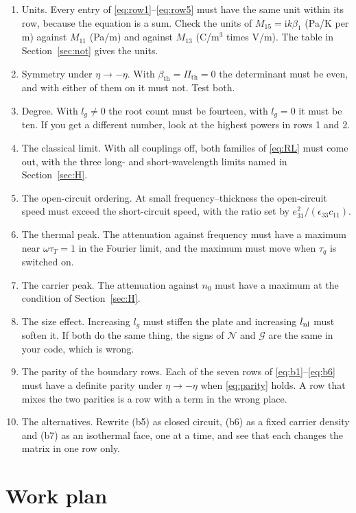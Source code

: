 \documentclass[11pt,a4paper]{article}
\newcommand{\Nc}{\mathcal{N}}
\newcommand{\Gc}{\mathcal{G}}
\newcommand{\bth}{\beta_{\mathrm{th}}}
\newcommand{\Pth}{\Pi_{\mathrm{th}}}
\newcommand{\ii}{\mathrm{i}}
\begin{document}
\begin{enumerate}
\item Units. Every entry of \eqref{eq:row1}--\eqref{eq:row5} must have the same unit within its row, because
the equation is a sum. Check the units of $M_{15}=\ii k\beta_1$ (Pa/K per m) against $M_{11}$ (Pa/m) and
against $M_{13}$ (C/m$^3$ times V/m). The table in Section~\ref{sec:not} gives the units.
\item Symmetry under $\eta\to-\eta$. With $\bth=\Pth=0$ the determinant must be even, and with either of them
on it must not. Test both.
\item Degree. With $l_g\ne0$ the root count must be fourteen, with $l_g=0$ it must be ten. If you get a
different number, look at the highest powers in rows 1 and 2.
\item The classical limit. With all couplings off, both families of \eqref{eq:RL} must come out, with the
three long- and short-wavelength limits named in Section~\ref{sec:H}.
\item The open-circuit ordering. At small frequency--thickness the open-circuit speed must exceed the
short-circuit speed, with the ratio set by $e_{31}^2/(\epsilon_{33}c_{11})$.
\item The thermal peak. The attenuation against frequency must have a maximum near $\omega\tau_T=1$ in the
Fourier limit, and the maximum must move when $\tau_q$ is switched on.
\item The carrier peak. The attenuation against $n_0$ must have a maximum at the condition of
Section~\ref{sec:H}.
\item The size effect. Increasing $l_g$ must stiffen the plate and increasing $l_{\rm nl}$ must soften it.
If both do the same thing, the signs of $\Nc$ and $\Gc$ are the same in your code, which is wrong.
\item The parity of the boundary rows. Each of the seven rows of \eqref{eq:b1}--\eqref{eq:b6} must have a
definite parity under $\eta\to-\eta$ when \eqref{eq:parity} holds. A row that mixes the two parities is a
row with a term in the wrong place.
\item The alternatives. Rewrite (b5) as closed circuit, (b6) as a fixed carrier density and (b7) as an
isothermal face, one at a time, and see that each changes the matrix in one row only.
\end{enumerate}

\section{Work plan}
\end{document}
